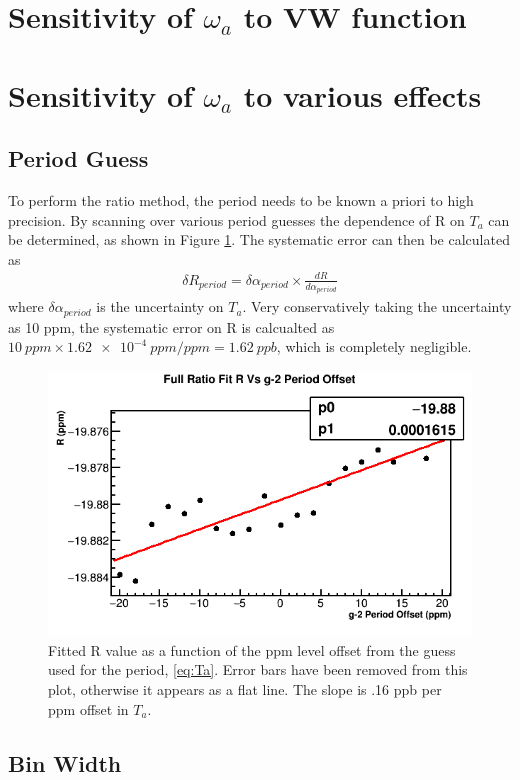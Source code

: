 \section{Sensitivity of \texorpdfstring{$\omega_{a}$}{} to VW function}

\section{Sensitivity of \texorpdfstring{$\omega_{a}$}{} to various effects}

\subsection{\gmtwo Period Guess}

To perform the ratio method, the \gmtwo period needs to be known a priori to high precision. By scanning over various \gmtwo period guesses the dependence of R on $T_{a}$ can be determined, as shown in Figure \ref{fig:gm2PeriodGuess}. The systematic error can then be calculated as 
	\begin{align}
		\delta R_{period} = \delta\alpha_{period} \times \frac{dR}{d\alpha_{period}}
	\end{align}
where $\delta\alpha_{period}$ is the uncertainty on $T_{a}$. Very conservatively taking the uncertainty as 10 ppm, the systematic error on R is calcualted as $\SI{10}{ppm} \times \SI{1.62e-4}{ppm/ppm} = \SI{1.62}{ppb}$, which is completely negligible.

\begin{figure}[H]
	\centering
	\includegraphics[width=.6\textwidth]{RatioCBO_R_Vs_gm2PeriodGuess_Canv}
    \caption[gm2PeriodGuess]{Fitted R value as a function of the ppm level offset from the guess used for the \gmtwo period, \ref{eq:Ta}. Error bars have been removed from this plot, otherwise it appears as a flat line. The slope is .16 ppb per ppm offset in $T_{a}$.}
    \label{fig:gm2PeriodGuess}
\end{figure}


\subsection{Bin Width}


